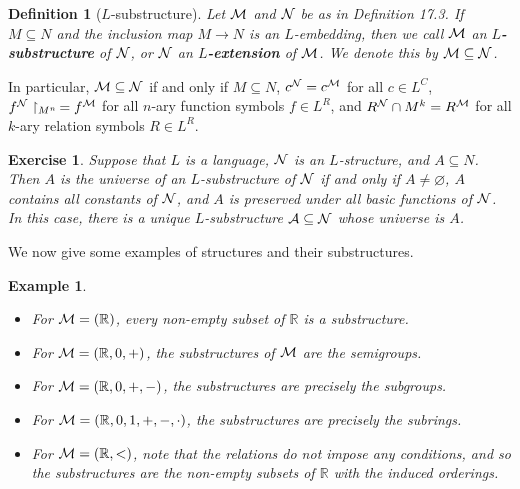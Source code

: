 \documentclass[10pt]{article}
\newcommand{\R}{\mathbb{R}}
\theoremstyle{newstyle}
\newtheorem{defn}[thm]{Definition}
\newtheorem{exercise}[thm]{Exercise}
\newtheorem{exmp}[thm]{Example}
\begin{document}
\begin{defn}[$L$-substructure] 
Let ${\cal M}$ and ${\cal N}$ be as in Definition 17.3. If $M \subseteq N$ and the inclusion map 
$M \to N$ is an $L$-embedding, then we call ${\cal M}$ an {\bf $L$-substructure} of 
${\cal N}$, or ${\cal N}$ an {\bf $L$-extension} of ${\cal M}$. 
We denote this by ${\cal M} \subseteq {\cal N}$.
\end{defn}

In particular, ${\cal M} \subseteq {\cal N}$ if and only if $M \subseteq N$, 
$c^{\cal N} = c^{\cal M}$ for all $c \in L^C$, $f^{\cal N} \upharpoonright_{M^n} \, = 
f^{\cal M}$ for all $n$-ary function symbols $f \in L^R$, and 
$R^{\cal N} \cap M^k = R^{\cal M}$ for all $k$-ary relation symbols $R \in L^R$.

\begin{exercise}
Suppose that $L$ is a language, ${\cal N}$ is an $L$-structure, and $A \subseteq N$. 
Then $A$ is the universe of an $L$-substructure of ${\cal N}$ if and only if 
$A \neq \varnothing$, $A$ contains all constants of ${\cal N}$, and 
$A$ is preserved under all basic functions of ${\cal N}$. In this case, there is a 
unique $L$-substructure ${\cal A} \subseteq {\cal N}$ whose universe is $A$.
\end{exercise}

We now give some examples of structures and their substructures. 

\begin{exmp}~
\begin{itemize}
    \item For ${\cal M} = (\R)$, every non-empty subset of $\R$ is a substructure. 
    \item For ${\cal M} = (\R, 0, +)$, the substructures of ${\cal M}$ are the semigroups. 
    \item For ${\cal M} = (\R, 0, +, -)$, the substructures are precisely the subgroups.
    \item For ${\cal M} = (\R, 0, 1, +, -, \cdot)$, the substructures are precisely the subrings.  
    \item For ${\cal M} = (\R, <)$, note that the relations do not impose any conditions, 
    and so the substructures are the non-empty subsets of $\R$ with the induced orderings.
\end{itemize}
\end{exmp}
\end{document}

